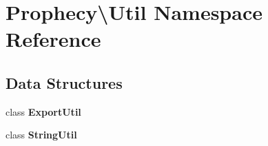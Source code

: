 \section{Prophecy\textbackslash{}Util Namespace Reference}
\label{namespace_prophecy_1_1_util}
\subsection*{Data Structures}
\begin{DoxyCompactItemize}
\item 
class {\bf Export\+Util}
\item 
class {\bf String\+Util}
\end{DoxyCompactItemize}
